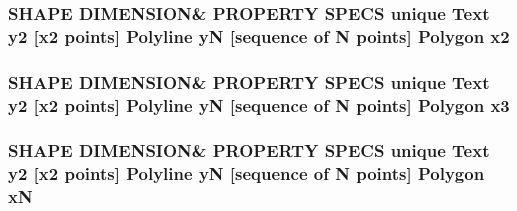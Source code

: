 \subsubsection[{\texorpdfstring{x2}{x2}}]{\setlength{\rightskip}{0pt plus 5cm}S\+H\+A\+PE D\+I\+M\+E\+N\+S\+I\+ON\& P\+R\+O\+P\+E\+R\+TY S\+P\+E\+CS unique {\bf Text} {\bf y2} \mbox{[}x2 points\mbox{]} {\bf Polyline} yN \mbox{[}sequence of N points\mbox{]} {\bf Polygon} x2}\hypertarget{shape__input__file__specs_8txt_a9f1fa2fb07ac3e1d8394274cb160df5c}{}\label{shape__input__file__specs_8txt_a9f1fa2fb07ac3e1d8394274cb160df5c}
\subsubsection[{\texorpdfstring{x3}{x3}}]{\setlength{\rightskip}{0pt plus 5cm}S\+H\+A\+PE D\+I\+M\+E\+N\+S\+I\+ON\& P\+R\+O\+P\+E\+R\+TY S\+P\+E\+CS unique {\bf Text} {\bf y2} \mbox{[}{\bf x2} points\mbox{]} {\bf Polyline} yN \mbox{[}sequence of N points\mbox{]} {\bf Polygon} x3}\hypertarget{shape__input__file__specs_8txt_a5d57507e254e2593e5a0a6a08c551eed}{}\label{shape__input__file__specs_8txt_a5d57507e254e2593e5a0a6a08c551eed}
\subsubsection[{\texorpdfstring{xN}{xN}}]{\setlength{\rightskip}{0pt plus 5cm}S\+H\+A\+PE D\+I\+M\+E\+N\+S\+I\+ON\& P\+R\+O\+P\+E\+R\+TY S\+P\+E\+CS unique {\bf Text} {\bf y2} \mbox{[}{\bf x2} points\mbox{]} {\bf Polyline} yN \mbox{[}sequence of N points\mbox{]} {\bf Polygon} xN}\hypertarget{shape__input__file__specs_8txt_a7c48dc90493b459f75b4b7583faca250}{}\label{shape__input__file__specs_8txt_a7c48dc90493b459f75b4b7583faca250}
